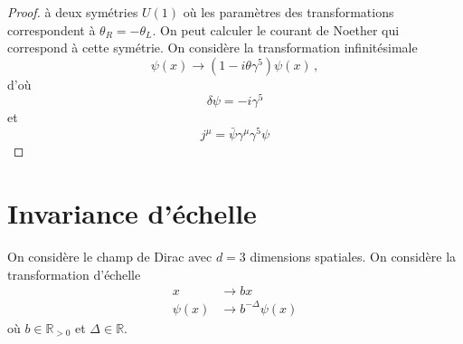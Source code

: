 \documentclass{article}
\numberwithin{equation}{section}
\theoremstyle{solution}
\begin{document}
\begin{proof}
à deux symétries $U(1)$ où les paramètres des transformations correspondent à $\theta_R = -\theta_L$.  
On peut calculer le courant de Noether qui correspond à cette symétrie. On considère la transformation infinitésimale
\begin{equation}
        \psi(x) \rightarrow  (1 - i \theta \gamma^{5}) \psi(x)\, ,
\end{equation} 
d'où
\begin{equation}
        \delta \psi = -i \gamma^{5}
\end{equation} 
et
\begin{equation}
        \boxed{j^{\mu} = \bar{\psi} \gamma^{\mu}\gamma^{5}\psi}
\end{equation} 
\end{proof} 



\section{Invariance d’échelle}
On considère le champ de Dirac avec $d=3$ dimensions spatiales. On considère la transformation d'échelle
\begin{equation}\label{eq:t_echelle}
        \begin{split}
                x &\rightarrow  b x \\
                \psi(x) &\rightarrow b^{-\Delta} \psi(x)
        \end{split}
\end{equation} 
où $b \in \mathbb{R}_{>0}$ et $\Delta \in \mathbb{R}$.
\end{document}
